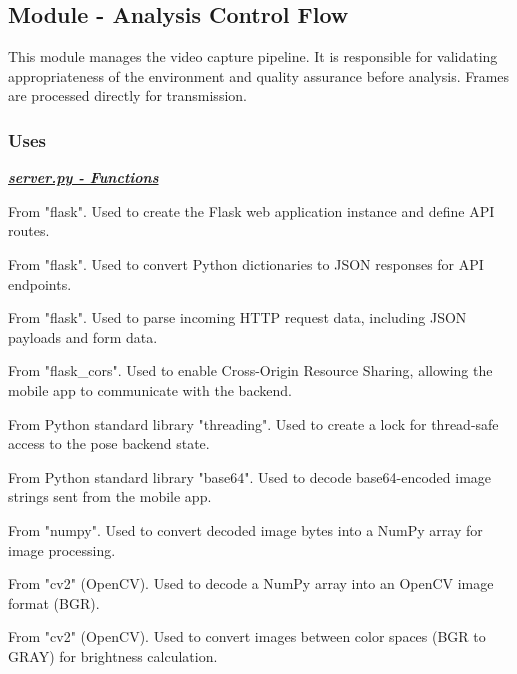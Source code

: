 \documentclass[12pt, titlepage]{article}
\begin{document}
\subsection{Module - Analysis Control Flow}
This module manages the video capture pipeline. It is responsible for validating appropriateness of the environment and 
quality assurance before analysis. Frames are processed directly for transmission. 

\subsubsection{Uses}
\noindent \textbf{\underline{\textit{server.py - Functions}}}\\
\begin{description}[style=nextline, leftmargin=2.5cm]
\item[\texttt{Flask}] 
    From "flask". Used to create the Flask web application instance and define API routes.

\item[\texttt{jsonify}] 
    From "flask". Used to convert Python dictionaries to JSON responses for API endpoints.

\item[\texttt{request}] 
    From "flask". Used to parse incoming HTTP request data, including JSON payloads and form data.

\item[\texttt{CORS}] 
    From "flask\_cors". Used to enable Cross-Origin Resource Sharing, allowing the mobile app to communicate with the backend.

\item[\texttt{threading.Lock}] 
    From Python standard library "threading". Used to create a lock for thread-safe access to the pose backend state.

\item[\texttt{base64.b64decode}] 
    From Python standard library "base64". Used to decode base64-encoded image strings sent from the mobile app.

\item[\texttt{np.frombuffer}] 
    From "numpy". Used to convert decoded image bytes into a NumPy array for image processing.

\item[\texttt{cv.imdecode}] 
    From "cv2" (OpenCV). Used to decode a NumPy array into an OpenCV image format (BGR).

\item[\texttt{cv.cvtColor}] 
    From "cv2" (OpenCV). Used to convert images between color spaces (BGR to GRAY) for brightness calculation.


\end{description}
\end{document}
